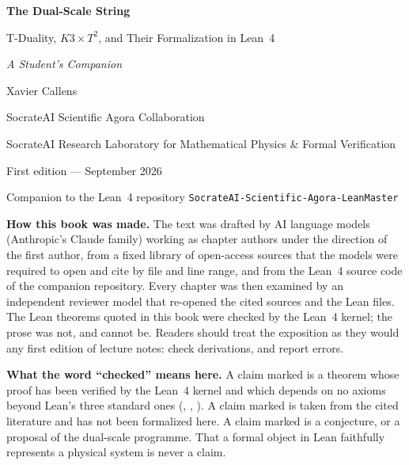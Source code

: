 \begin{titlepage}
\centering
\vspace*{3cm}
{\Huge\bfseries The Dual-Scale String\par}
\vspace{0.8cm}
{\LARGE T-Duality, $K3\times T^2$, and Their Formalization in Lean~4\par}
\vspace{0.6cm}
{\Large\itshape A Student's Companion\par}
\vspace{2.5cm}
{\Large Xavier Callens\par}
\vspace{0.3cm}
{\large SocrateAI Scientific Agora Collaboration\par}
\vspace{0.3cm}
{\normalsize SocrateAI Research Laboratory for Mathematical Physics \& Formal Verification\par}
\vfill
{\large First edition --- September 2026\par}
\vspace{0.4cm}
{\small Companion to the Lean~4 repository \texttt{SocrateAI-Scientific-Agora-LeanMaster}\par}
\end{titlepage}

\thispagestyle{empty}
\vspace*{\fill}
\noindent\textbf{How this book was made.}
The text was drafted by AI language models (Anthropic's Claude family) working as chapter authors under
the direction of the first author, from a fixed library of open-access sources that the models were
required to open and cite by file and line range, and from the Lean~4 source code of the companion
repository. Every chapter was then examined by an independent reviewer model that re-opened the cited
sources and the Lean files. The Lean theorems quoted in this book were checked by the Lean~4 kernel; the
prose was not, and cannot be. Readers should treat the exposition as they would any first edition of
lecture notes: check derivations, and report errors.

\medskip\noindent\textbf{What the word ``checked'' means here.}
A claim marked \TA{} is a theorem whose proof has been verified by the Lean~4 kernel and which depends on
no axioms beyond Lean's three standard ones (, , ).
A claim marked \TL{} is taken from the cited literature and has not been formalized here. A claim marked
\TC{} is a conjecture, or a proposal of the dual-scale programme. That a formal object in Lean faithfully
represents a physical system is never a \TA{} claim.

